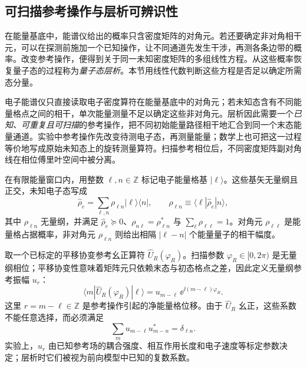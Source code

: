 

\subsection{可扫描参考操作与层析可辨识性}

在能量基底中，能谱仪给出的概率只含密度矩阵的对角元。若还要确定非对角相干元，可以在探测前施加一个已知操作，让不同通道先发生干涉，再测各条边带的概率。改变参考操作，便得到关于同一未知密度矩阵的多组线性方程。从这些概率恢复量子态的过程称为\emph{量子态层析}。本节用线性代数判断这些方程是否足以确定所需态分量。

\begin{exbox}[能量格与纵向相空间层析]
电子能谱仪只直接读取电子密度算符在能量基底中的对角元；若未知态含有不同能量格点之间的相干，单次能量测量不足以确定这些非对角元。层析因此需要一个\emph{已知、可重复且可扫描}的参考操作，把不同初始能量路径相干地汇合到同一个末态能量通道。实验中参考操作先改变待测电子态，再测量能量；数学上也可把这一过程等价地写成原始未知态上的旋转测量算符。扫描参考相位后，不同密度矩阵副对角线在相位傅里叶空间中被分离。

在有限能量窗口内，用整数 $\ell,n\in\mathbb Z$ 标记电子能量格基 $|\ell\rangle$。这些基矢无量纲且正交，未知电子态写成
\begin{equation*}
\hat\rho_e
=\sum_{\ell,n}\rho_{\ell n}|\ell\rangle\langle n|,
\qquad
\rho_{\ell n}\equiv\langle\ell|\hat\rho_e|n\rangle,
\end{equation*}
其中 $\rho_{\ell n}$ 无量纲，并满足 $\hat\rho_e\succeq0$、$\rho_{n\ell}=\rho_{\ell n}^*$ 与 $\sum_\ell\rho_{\ell\ell}=1$。对角元 $\rho_{\ell\ell}$ 是能量格占据概率，非对角元 $\rho_{\ell n}$ 则给出相隔 $|\ell-n|$ 个能量量子的相干幅度。

取一个已标定的平移协变参考幺正算符 $\hat U_R(\varphi_R)$。扫描参数 $\varphi_R\in[0,2\pi)$ 是无量纲相位；平移协变性意味着矩阵元只依赖末态与初态格点之差，因此定义无量纲参考振幅 $u_r$：
\begin{equation}
\boxed{
\langle m|\hat U_R(\varphi_R)|\ell\rangle
=u_{m-\ell}\,\ee^{\ii(m-\ell)\varphi_R}.}
\label{eq:reference-pinem-matrix}
\end{equation}
这里 $r=m-\ell\in\mathbb Z$ 是参考操作引起的净能量格位移。由于 $\hat U_R$ 幺正，这些系数不能任意选择，而必须满足
\begin{equation*}
\sum_m u_{m-\ell}u_{m-n}^*=\delta_{\ell n}.
\end{equation*}
实验上，$u_r$ 由已知参考场的耦合强度、相互作用长度和电子速度等标定参数决定；层析时它们被视为前向模型中已知的复数系数。


\end{exbox}
